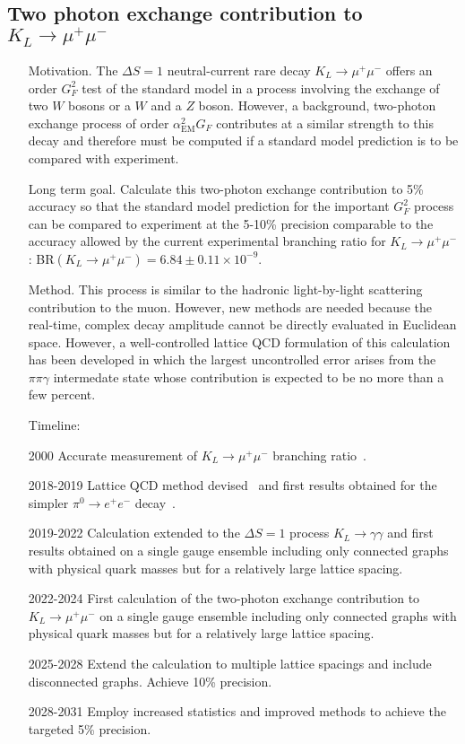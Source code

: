 \documentclass[prd,showpacs,showkeys,preprintnumbers,floatfix,
nofootinbib%
]{revtex4-2}
\begin{document}
\subsection{Two photon exchange contribution to $K_L\to\mu^+\mu^-$}
\begin{itemize}
    \item[Motivation.] The $\Delta S=1$ neutral-current rare decay $K_L\to\mu^+\mu^-$ 
    offers an order $G_F^2$ test of the standard model in a process involving the 
    exchange of two $W$ bosons or a $W$ and a $Z$ boson.  However, a background, 
    two-photon exchange process of order $\alpha_{\mathrm{EM}}^2G_F$ contributes 
    at a similar strength to this decay and therefore must be computed if a standard 
    model prediction is to be compared with experiment.
    \item[Long term goal.] Calculate this two-photon exchange contribution to 5\% 
    accuracy so that the standard model prediction for the important $G_F^2$ process 
    can be compared to experiment at the 5-10\% precision comparable to the accuracy 
    allowed by the current experimental branching ratio for $K_L\to\mu^+\mu^-$: 
    BR$(K_L\to\mu^+\mu^-) = 6.84\pm0.11\times 10^{-9}$.
    \item[Method.]  This process is similar to the hadronic light-by-light scattering 
    contribution to the muon.  However, new methods are needed because the 
    real-time, complex decay amplitude cannot be directly evaluated in Euclidean 
    space.  However, a well-controlled lattice QCD formulation of this calculation 
    has been developed in which the largest uncontrolled error arises from the 
    $\pi\pi\gamma$ intermedate state whose contribution is expected to be no 
    more than a few percent.
\item[Timeline:]
    \item[2000] Accurate measurement of $K_L\to\mu^+\mu^-$ branching 
    ratio~\cite{E871:2000wvm}.
    \item[2018-2019] Lattice QCD method devised~\cite{Christ:2020bzb} and 
    first results obtained for the simpler $\pi^0\to e^+ e^-$ 
    decay~\cite{Christ:2020dae, Christ:2022rho}.
    \item[2019-2022] Calculation extended to the $\Delta S=1$ process 
    $K_L\to\gamma\gamma$ and first results obtained on a single gauge 
    ensemble including only connected graphs with physical quark masses 
    but for a relatively large lattice spacing.~\cite{Zhao:2022pbs, Zhao:2022njd}
    \item[2022-2024] First calculation of the two-photon exchange contribution 
    to $K_L\to\mu^+ \mu^-$ on a single gauge ensemble including only connected 
    graphs with physical quark masses but for a relatively large lattice spacing.
    \item[2025-2028] Extend the calculation to multiple lattice spacings and include 
    disconnected graphs.  Achieve 10\% precision.
    \item[2028-2031] Employ increased statistics and improved methods to 
    achieve the targeted 5\% precision.
 \end{itemize}
 
\end{document}
